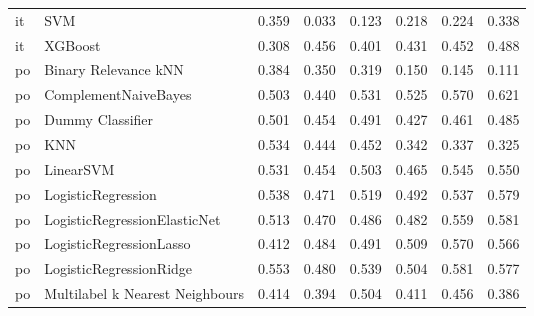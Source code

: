 \begin{tabular}{llllllll}
      it &                             SVM & 0.359 &                     0.033 &                 0.123 &                  0.218 &                                   0.224 &     0.338 \\
      it &                         XGBoost & 0.308 &                     0.456 &                 0.401 &                  0.431 &                                   0.452 &     0.488 \\
      po &            Binary Relevance kNN & 0.384 &                     0.350 &                 0.319 &                  0.150 &                                   0.145 &     0.111 \\
      po &            ComplementNaiveBayes & 0.503 &                     0.440 &                 0.531 &                  0.525 &                                   0.570 &     0.621 \\
      po &                Dummy Classifier & 0.501 &                     0.454 &                 0.491 &                  0.427 &                                   0.461 &     0.485 \\
      po &                             KNN & 0.534 &                     0.444 &                 0.452 &                  0.342 &                                   0.337 &     0.325 \\
      po &                       LinearSVM & 0.531 &                     0.454 &                 0.503 &                  0.465 &                                   0.545 &     0.550 \\
      po &              LogisticRegression & 0.538 &                     0.471 &                 0.519 &                  0.492 &                                   0.537 &     0.579 \\
      po &    LogisticRegressionElasticNet & 0.513 &                     0.470 &                 0.486 &                  0.482 &                                   0.559 &     0.581 \\
      po &         LogisticRegressionLasso & 0.412 &                     0.484 &                 0.491 &                  0.509 &                                   0.570 &     0.566 \\
      po &         LogisticRegressionRidge & 0.553 &                     0.480 &                 0.539 &                  0.504 &                                   0.581 &     0.577 \\
      po & Multilabel k Nearest Neighbours & 0.414 &                     0.394 &                 0.504 &                  0.411 &                                   0.456 &     0.386 \\

\end{tabular}
